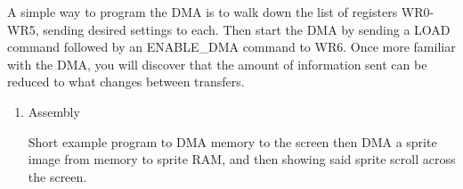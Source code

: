 A simple way to program the DMA is to walk down the list of registers
WR0-WR5, sending desired settings to each. Then start the DMA by
sending a LOAD command followed by an ENABLE\_DMA command to WR6. Once
more familiar with the DMA, you will discover that the amount of
information sent can be reduced to what changes between transfers.

\begin{enumerate}
\item Assembly

  Short example program to DMA memory to the screen then DMA a sprite
  image from memory to sprite RAM, and then showing said sprite scroll
  across the screen.

  
\end{enumerate}
